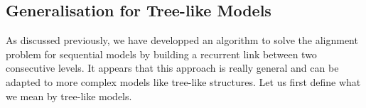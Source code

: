 \documentclass[conference]{IEEEtran}
\begin{document}
\subsection{Generalisation for Tree-like Models} \label{tree_like structures}

As discussed previously, we have developped an algorithm to solve the alignment problem for sequential models by building a recurrent link between two consecutive levels. It appears that this approach is really general and can be adapted to more complex models like tree-like structures. Let us first define what we mean by tree-like models.



\end{document}
